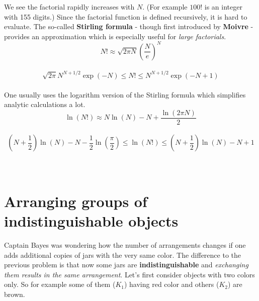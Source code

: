 \documentclass[12pt, a4paper]{scrartcl}
\begin{document}
We see the factorial rapidly increases with $N$. (For example $100!$ is an integer with 155 digits.) 
Since the factorial function is defined recursively, it is hard to evaluate. The so-called \textbf{Stirling formula} - though first introduced by \textbf{Moivre} - provides an approximation which is especially useful for \textit{large factorials}.
\begin{equation*}\boxed{N! \approx \sqrt{2\pi N}\left( \frac{N}{e}\right)^N
}\end{equation*}\\
\begin{equation*}\boxed{\sqrt{2\pi}N^{N+1/2}\exp(-N)\leq N!\leq N^{N+1/2}\exp(-N+1)
}\end{equation*}\\
One usually uses the logarithm version of the Stirling formula which simplifies analytic calculations a lot.\\

\begin{equation*}\boxed{\ln(N!)\approx N \ln(N)-N+\frac{\ln(2\pi N)}{2}
}\end{equation*}\\
\begin{equation*}\boxed{\left(N+\frac 12 \right)\ln(N)-N-\frac 12 \ln\left(\frac{\pi}{2}\right)\leq \ln(N!)\leq\left(N+\frac 12\right)\ln(N) - N+1
}\end{equation*}\\
\\
\section*{Arranging groups of indistinguishable objects}
Captain  Bayes was wondering how the number of arrangements changes if one adds additional copies of jars with the very same color.
The difference to the previous problem is that now some jars are \textbf{indistinguishable} and \textit{exchanging them results in the same arrangement}.
Let’s first consider objects with two colors only. So for example some of them ($K_1$) having red color and others ($K_2$) are brown.
\end{document}
